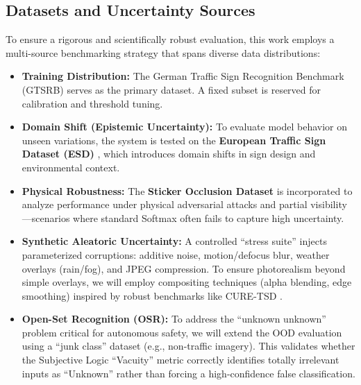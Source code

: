 \documentclass[11pt,a4paper]{article}
\begin{document}
\subsection{Datasets and Uncertainty Sources}
To ensure a rigorous and scientifically robust evaluation, this work employs a multi-source benchmarking strategy that spans diverse data distributions:
\begin{itemize}
  \item \textbf{Training Distribution:} The German Traffic Sign Recognition Benchmark (GTSRB) \cite{stallkamp2011gtsrb} serves as the primary dataset. A fixed subset is reserved for calibration and threshold tuning.
  \item \textbf{Domain Shift (Epistemic Uncertainty):} To evaluate model behavior on unseen variations, the system is tested on the \textbf{European Traffic Sign Dataset (ESD)} \cite{gamez2018esd}, which introduces domain shifts in sign design and environmental context.
  \item \textbf{Physical Robustness:} The \textbf{Sticker Occlusion Dataset} \cite{bayzidi2022stickers} is incorporated to analyze performance under physical adversarial attacks and partial visibility—scenarios where standard Softmax often fails to capture high uncertainty.
  \item \textbf{Synthetic Aleatoric Uncertainty:} A controlled ``stress suite'' injects parameterized corruptions: additive noise, motion/defocus blur, weather overlays (rain/fog), and JPEG compression. To ensure photorealism beyond simple overlays, we will employ compositing techniques (alpha blending, edge smoothing) inspired by robust benchmarks like CURE-TSD \cite{temel2020cure}.
  \item \textbf{Open-Set Recognition (OSR):} To address the ``unknown unknown'' problem critical for autonomous safety, we will extend the OOD evaluation using a ``junk class'' dataset (e.g., non-traffic imagery). This validates whether the Subjective Logic ``Vacuity'' metric correctly identifies totally irrelevant inputs as ``Unknown'' rather than forcing a high-confidence false classification.
\end{itemize}
\end{document}
